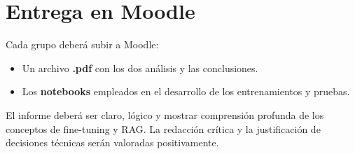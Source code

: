 \documentclass[a4paper]{article}
\begin{document}
\section{Entrega en Moodle}
Cada grupo deberá subir a Moodle:
\begin{itemize}
    \item Un archivo \textbf{.pdf} con los dos análisis y las conclusiones.
    \item Los \textbf{notebooks} empleados en el desarrollo de los entrenamientos y pruebas.
\end{itemize}

El informe deberá ser claro, lógico y mostrar comprensión profunda de los conceptos de fine-tuning y RAG.  
La redacción crítica y la justificación de decisiones técnicas serán valoradas positivamente.

\doclicenseThis
\end{document}
